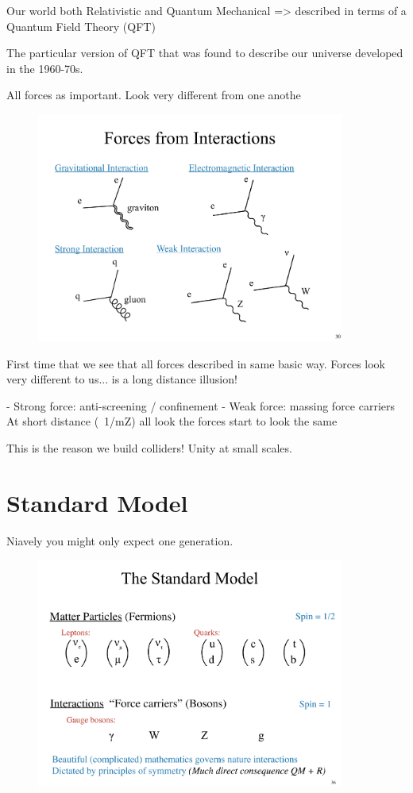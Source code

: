 Our world both Relativistic and Quantum Mechanical => described in terms of a Quantum Field Theory (QFT)

The particular version of QFT that was found to describe our universe developed in the 1960-70s.

All forces as important.
Look very different from one anothe

\begin{figure}[h]
\centering
\includegraphics[width=0.9\textwidth]{./Forces.pdf}
\end{figure}


First time that we see that all forces described in same basic way.
Forces look very different to us... is a long distance illusion!


- Strong force: anti-screening / confinement
- Weak force: massing force carriers
At short distance (~1/mZ) all look the forces start to look the same


This is the reason we build colliders! Unity at small scales.



\section{Standard Model}

Niavely you might only expect one generation.

\begin{figure}[h]
\centering
\includegraphics[width=0.9\textwidth]{./SM.pdf}
\end{figure}



